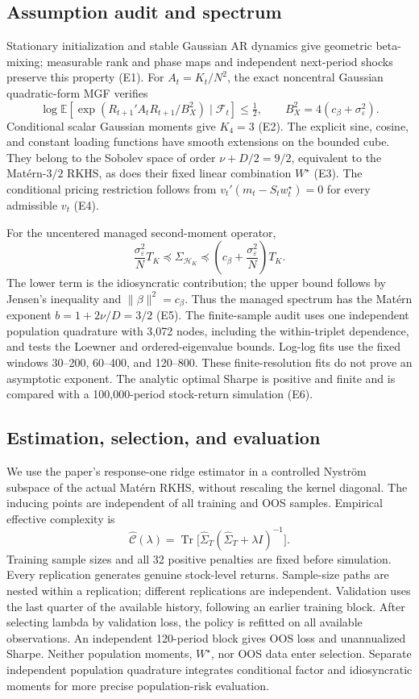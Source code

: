 \subsection{Assumption audit and spectrum}
Stationary initialization and stable Gaussian AR dynamics give geometric
beta-mixing; measurable rank and phase maps and independent next-period shocks
preserve this property (E1). For $A_t=K_t/N^2$, the exact noncentral Gaussian
quadratic-form MGF verifies
\[
\log\mathbb E\!\left[\exp\left(R_{t+1}'A_tR_{t+1}/B_X^2\right)
\mid\mathcal F_t\right]\leq\tfrac12,
\qquad B_X^2=4(c_\beta+\sigma_\varepsilon^2).
\]
Conditional scalar Gaussian moments give $K_4=3$ (E2). The explicit sine,
cosine, and constant loading functions have smooth extensions on the bounded
cube. They belong to the Sobolev space of order $\nu+D/2=9/2$, equivalent to
the Mat\'ern-$3/2$ RKHS, as does their fixed linear combination $W^\star$ (E3).
The conditional pricing restriction follows from
$v_t'(m_t-S_tw_t^\star)=0$ for every admissible $v_t$ (E4).

For the uncentered managed second-moment operator,
\[
\frac{\sigma_\varepsilon^2}{N}T_K\preceq\Sigma_{\mathcal H_K}
\preceq\left(c_\beta+\frac{\sigma_\varepsilon^2}{N}\right)T_K.
\]
The lower term is the idiosyncratic contribution; the upper bound follows by
Jensen's inequality and $\|\beta\|^2=c_\beta$. Thus the managed spectrum has
the Mat\'ern exponent $b=1+2\nu/D=3/2$ (E5). The finite-sample audit uses one
independent population quadrature with 3,072 nodes, including the within-triplet
dependence, and tests the Loewner and ordered-eigenvalue bounds. Log-log fits use
the fixed windows 30--200, 60--400, and 120--800. These finite-resolution fits do
not prove an asymptotic exponent. The analytic optimal Sharpe is positive and
finite and is compared with a 100,000-period stock-return simulation (E6).

\subsection{Estimation, selection, and evaluation}
We use the paper's response-one ridge estimator in a controlled Nystr\"om
subspace of the actual Mat\'ern RKHS, without rescaling the kernel diagonal.
The inducing points are independent of all training and OOS samples. Empirical
effective complexity is
\[
\widehat{\mathcal C}(\lambda)=\operatorname{Tr}
\bigl[\widehat\Sigma_T(\widehat\Sigma_T+\lambda I)^{-1}\bigr].
\]
Training sample sizes and all 32 positive penalties are fixed before simulation.
Every replication generates genuine stock-level returns. Sample-size paths are
nested within a replication; different replications are independent. Validation
uses the last quarter of the available history, following an earlier training
block. After selecting lambda by validation loss, the policy is refitted on all
available observations. An independent 120-period block gives OOS loss and
unannualized Sharpe. Neither population moments, $W^\star$, nor OOS data enter
selection. Separate independent population quadrature integrates conditional
factor and idiosyncratic moments for more precise population-risk evaluation.

